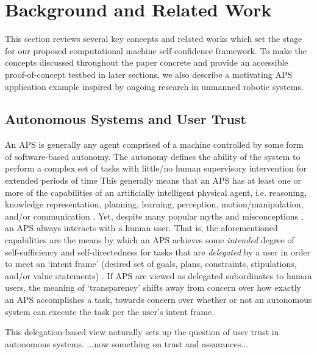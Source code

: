\section{Background and Related Work}
This section reviews several key concepts and related works which set the stage for our proposed computational machine self-confidence framework. To make the concepts discussed throughout the paper concrete and provide an accessible proof-of-concept testbed in later sections, we also describe a motivating APS application example inspired by ongoing research in unmanned robotic systems.  

\subsection{Autonomous Systems and User Trust}
An APS is generally any agent comprised of a machine controlled by some form of software-based autonomy. The autonomy defines the ability of the system to perform a complex set of tasks with little/no human supervisory intervention for extended periods of time  This generally means that an APS has at least one or more of the capabilities of an artificially intelligent physical agent, i.e. reasoning, knowledge representation, planning, learning, perception, motion/manipulation, and/or communication \cite{Israelsen2017-ym}. 
Yet, despite many popular myths and misconceptions \cite{Bradshaw2013-ck}, an APS always interacts with a human user. 
That is, the aforementioned capabilities are the means by which an APS achieves some \emph{intended} degree of self-sufficiency and self-directedness for tasks that are \emph{delegated} by a user in order to meet an `intent frame' (desired set of goals, plans, constraints, stipulations, and/or value statements) \cite{Miller2014-av}. 
If APS are viewed as delegated subordinates to human users, the meaning of `transparency' shifts away from concern over how exactly an APS accomplishes a task, towards concern over whether or not an autonomous system can execute the task per the user's intent frame. 

This delegation-based view naturally sets up the question of user trust in autonomous systems. ...now something on trust and assurances...

